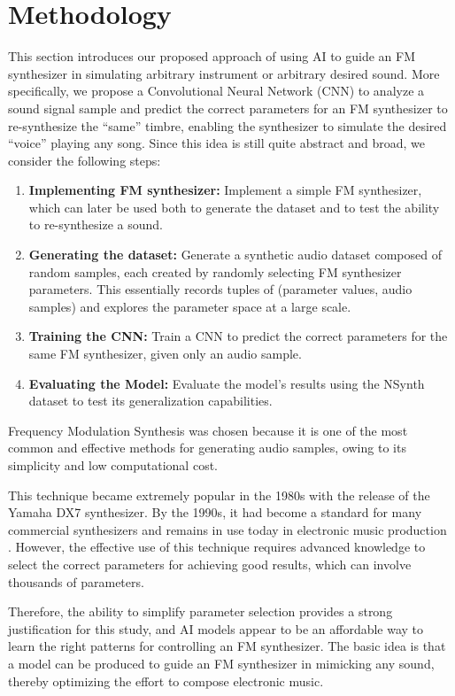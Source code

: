 \documentclass[10pt,conference]{IEEEtran}
\begin{document}
\section{Methodology} \label{sec:our_proposal}

This section introduces our proposed approach of using AI to guide an FM synthesizer in simulating arbitrary instrument or arbitrary desired sound. More specifically, we propose a Convolutional Neural Network (CNN) to analyze a sound signal sample and predict the correct parameters for an FM synthesizer to re-synthesize the ``same'' timbre, enabling the synthesizer to simulate the desired ``voice'' playing any song. Since this idea is still quite abstract and broad, we consider the following steps:

\begin{enumerate}
    \item \textbf{Implementing FM synthesizer:} Implement a simple FM synthesizer, which can later be used both to generate the dataset and to test the ability to re-synthesize a sound.
    \item \textbf{Generating the dataset:} Generate a synthetic audio dataset composed of random samples, each created by randomly selecting FM synthesizer parameters. This essentially records tuples of (parameter values, audio samples) and explores the parameter space at a large scale.
    \item \textbf{Training the CNN:} Train a CNN to predict the correct parameters for the same FM synthesizer, given only an audio sample.
    \item \textbf{Evaluating the Model:} Evaluate the model's results using the NSynth dataset to test its generalization capabilities.
\end{enumerate}

Frequency Modulation Synthesis was chosen because it is one of the most common and effective methods for generating audio samples, owing to its simplicity and low computational cost.

This technique became extremely popular in the 1980s with the release of the Yamaha DX7 synthesizer. By the 1990s, it had become a standard for many commercial synthesizers and remains in use today in electronic music production \cite{claesson2021resynthesis}. However, the effective use of this technique requires advanced knowledge to select the correct parameters for achieving good results, which can involve thousands of parameters.

Therefore, the ability to simplify parameter selection provides a strong justification for this study, and AI models appear to be an affordable way to learn the right patterns for controlling an FM synthesizer. The basic idea is that a model can be produced to guide an FM synthesizer in mimicking any sound, thereby optimizing the effort to compose electronic music.
\end{document}
